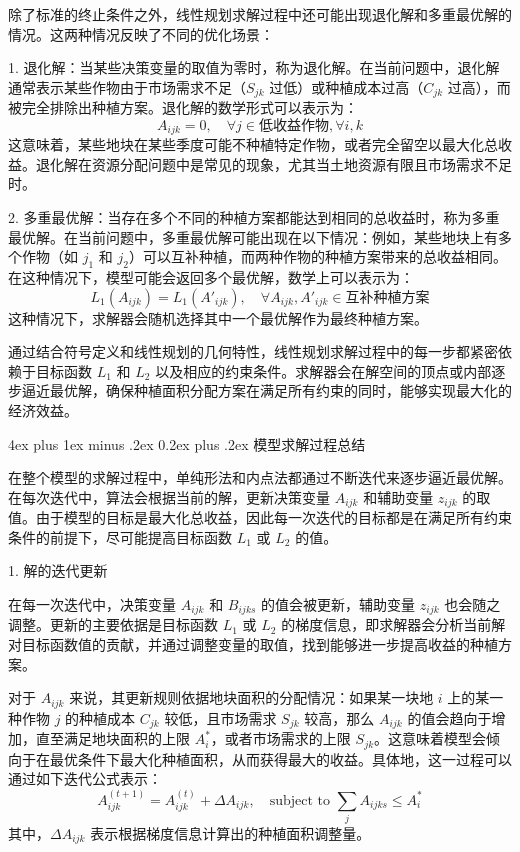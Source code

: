 \documentclass[12pt,a4paper]{nmmcm}
\makeatletter
\renewcommand\subsubsection{\@startsection{subsubsection}{3}{1em}%
  {4ex plus 1ex minus .2ex}%
  {0.2ex plus .2ex}%
  {\normalfont\large\bfseries}}
\makeatother
\begin{document}
除了标准的终止条件之外，线性规划求解过程中还可能出现退化解和多重最优解的情况。这两种情况反映了不同的优化场景：

1. 退化解：当某些决策变量的取值为零时，称为退化解。在当前问题中，退化解通常表示某些作物由于市场需求不足（$S_{jk}$ 过低）或种植成本过高（$C_{jk}$ 过高），而被完全排除出种植方案。退化解的数学形式可以表示为：
   \[
   A_{ijk} = 0, \quad \forall j \in \text{低收益作物}, \forall i, k
   \]
   这意味着，某些地块在某些季度可能不种植特定作物，或者完全留空以最大化总收益。退化解在资源分配问题中是常见的现象，尤其当土地资源有限且市场需求不足时。

2. 多重最优解：当存在多个不同的种植方案都能达到相同的总收益时，称为多重最优解。在当前问题中，多重最优解可能出现在以下情况：例如，某些地块上有多个作物（如 $j_1$ 和 $j_2$）可以互补种植，而两种作物的种植方案带来的总收益相同。在这种情况下，模型可能会返回多个最优解，数学上可以表示为：
   \[
   L_1(A_{ijk}) = L_1(A'_{ijk}), \quad \forall A_{ijk}, A'_{ijk} \in \text{互补种植方案}
   \]
   这种情况下，求解器会随机选择其中一个最优解作为最终种植方案。

通过结合符号定义和线性规划的几何特性，线性规划求解过程中的每一步都紧密依赖于目标函数 $L_1$ 和 $L_2$ 以及相应的约束条件。求解器会在解空间的顶点或内部逐步逼近最优解，确保种植面积分配方案在满足所有约束的同时，能够实现最大化的经济效益。

\subsubsection{模型求解过程总结}

在整个模型的求解过程中，单纯形法和内点法都通过不断迭代来逐步逼近最优解。在每次迭代中，算法会根据当前的解，更新决策变量 $A_{ijk}$ 和辅助变量 $z_{ijk}$ 的取值。由于模型的目标是最大化总收益，因此每一次迭代的目标都是在满足所有约束条件的前提下，尽可能提高目标函数 $L_1$ 或 $L_2$ 的值。

 1. 解的迭代更新

在每一次迭代中，决策变量 $A_{ijk}$ 和 $B_{ijks}$ 的值会被更新，辅助变量 $z_{ijk}$ 也会随之调整。更新的主要依据是目标函数 $L_1$ 或 $L_2$ 的梯度信息，即求解器会分析当前解对目标函数值的贡献，并通过调整变量的取值，找到能够进一步提高收益的种植方案。

对于 $A_{ijk}$ 来说，其更新规则依据地块面积的分配情况：如果某一块地 $i$ 上的某一种作物 $j$ 的种植成本 $C_{jk}$ 较低，且市场需求 $S_{jk}$ 较高，那么 $A_{ijk}$ 的值会趋向于增加，直至满足地块面积的上限 $A_i^*$，或者市场需求的上限 $S_{jk}$。这意味着模型会倾向于在最优条件下最大化种植面积，从而获得最大的收益。具体地，这一过程可以通过如下迭代公式表示：
\[
A_{ijk}^{(t+1)} = A_{ijk}^{(t)} + \Delta A_{ijk}, \quad \text{subject to } \sum_j A_{ijks} \leq A_i^*
\]
其中，$\Delta A_{ijk}$ 表示根据梯度信息计算出的种植面积调整量。
\end{document}
